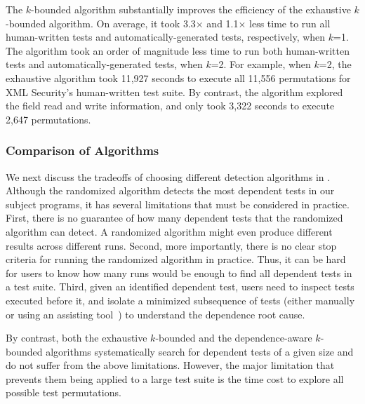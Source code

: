 The \dependenceaware{} $k$-bounded algorithm substantially improves
the efficiency of the exhaustive $k$-bounded algorithm. On average,
it took 3.3$\times$ and 1.1$\times$ less time to run all
human-written tests and automatically-generated tests, respectively, when $k$=1.
The \dependenceaware{} algorithm took an order of magnitude
less time to run both human-written tests and automatically-generated tests,
when $k$=2.
For example, when $k$=2, the exhaustive algorithm took 11,927 seconds
to execute all 11,556 permutations for XML Security's human-written test suite.
By contrast, the \dependenceaware{} algorithm
explored the field read and write information, and
only took 3,322 seconds to execute 2,647 permutations.





\subsubsection{Comparison of Algorithms}
\label{sec:algcomparison}

We next discuss the tradeoffs of choosing different detection
algorithms in \ourtool. Although the randomized algorithm
detects the most dependent tests in our subject programs,
it has several limitations that must be considered
in practice. First, there is no guarantee of how many
dependent tests that the randomized algorithm can detect. A randomized
algorithm might even produce different results across different runs.
Second, more importantly, there is no clear stop criteria
for running the randomized algorithm in practice.
Thus, it can be hard for users
to know how many runs would be enough to find all dependent tests in a test suite.
Third, given an identified dependent test, users
need to inspect tests executed before it, and isolate a minimized
subsequence of tests (either
manually or using an assisting tool~\cite{Zeller:2002}) to understand the dependence root cause.

By contrast, both the exhaustive $k$-bounded and the depend\-ence-aware
$k$-bounded algorithms systematically search for dependent
tests of a given size and do not suffer from the above limitations.
However, the major limitation that prevents them being applied to a
large test suite is the time cost to
explore all possible test permutations.





